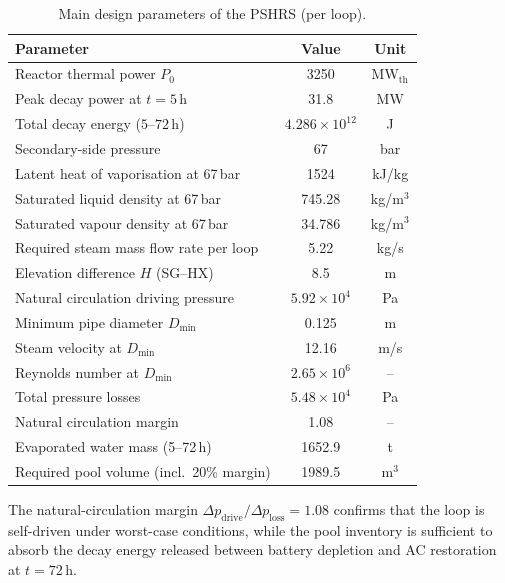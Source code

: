 \documentclass[a4paper,11pt]{article}
\numberwithin{subsubsection}{subsection}
\numberwithin{subsection}{section}
\begin{document}
\begin{table}[H]
\centering
\caption{Main design parameters of the PSHRS (per loop).}
\label{tab:pshrs_design}
\begin{tabular}{lcc}
\hline
Parameter & Value & Unit \\
\hline
Reactor thermal power $P_0$              & 3250                  & MW$_{\text{th}}$ \\
Peak decay power at $t=5$\,h             & 31.8                  & MW \\
Total decay energy ($5$--$72$\,h)        & $4.286\times10^{12}$  & J \\
Secondary-side pressure                  & 67                    & bar \\
Latent heat of vaporisation at 67\,bar   & 1524                  & kJ/kg \\
Saturated liquid density at 67\,bar      & 745.28                & kg/m$^{3}$ \\
Saturated vapour density at 67\,bar      & 34.786                & kg/m$^{3}$ \\
Required steam mass flow rate per loop   & 5.22                  & kg/s \\
Elevation difference $H$ (SG--HX)        & 8.5                   & m \\
Natural circulation driving pressure     & $5.92\times10^{4}$    & Pa \\
Minimum pipe diameter $D_{\min}$         & 0.125                 & m \\
Steam velocity at $D_{\min}$             & 12.16                 & m/s \\
Reynolds number at $D_{\min}$            & $2.65\times10^{6}$    & -- \\
Total pressure losses                    & $5.48\times10^{4}$    & Pa \\
Natural circulation margin               & 1.08                  & -- \\
Evaporated water mass (5--72\,h)         & 1652.9                & t \\
Required pool volume (incl.\ 20\% margin)& 1989.5                & m$^{3}$ \\
\hline
\end{tabular}
\end{table}

The natural-circulation margin $\Delta p_{\text{drive}}/\Delta p_{\text{loss}}=1.08$
confirms that the loop is self-driven under worst-case conditions,
while the pool inventory is sufficient to absorb the decay energy
released between battery depletion and AC restoration at $t=72$\,h.
\end{document}
